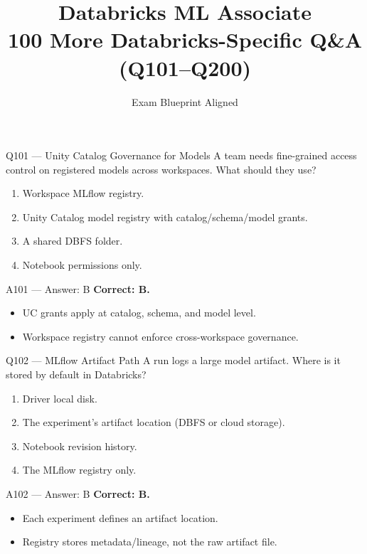 \documentclass[aspectratio=169,9pt]{beamer}
\title{Databricks ML Associate\\100 More Databricks-Specific Q\&A (Q101--Q200)}
\author{Exam Blueprint Aligned}
\date{}
\begin{document}
	
	\frame{\titlepage}
	
	
	\begin{frame}{Q101 --- Unity Catalog Governance for Models}
		A team needs fine-grained access control on registered models across workspaces. What should they use?
		\begin{enumerate}[label=\Alph*.]
			\item Workspace MLflow registry.
			\item Unity Catalog model registry with catalog/schema/model grants.
			\item A shared DBFS folder.
			\item Notebook permissions only.
		\end{enumerate}
	\end{frame}
	
	\begin{frame}{A101 --- Answer: B}
		\textbf{Correct: B.}
		\begin{itemize}
			\item UC grants apply at catalog, schema, and model level.
			\item Workspace registry cannot enforce cross-workspace governance.
		\end{itemize}
	\end{frame}
	
	\begin{frame}{Q102 --- MLflow Artifact Path}
		A run logs a large model artifact. Where is it stored by default in Databricks?
		\begin{enumerate}[label=\Alph*.]
			\item Driver local disk.
			\item The experiment's artifact location (DBFS or cloud storage).
			\item Notebook revision history.
			\item The MLflow registry only.
		\end{enumerate}
	\end{frame}
	
	\begin{frame}{A102 --- Answer: B}
		\textbf{Correct: B.}
		\begin{itemize}
			\item Each experiment defines an artifact location.
			\item Registry stores metadata/lineage, not the raw artifact file.
		\end{itemize}
	\end{frame}
	
\end{document}
